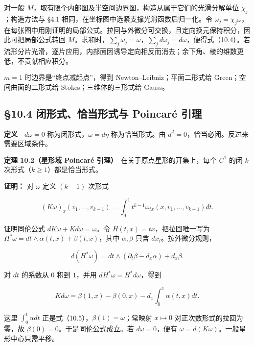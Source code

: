 \documentclass[11pt,a4paper]{article}
\begin{document}
对一般 \(M\)，取有限个内部图及半空间边界图，构造从属于它们的光滑分解单位
\(\chi_j\)；构造方法与 §4.1 相同，在坐标图中选紧支撑光滑函数后归一化。令
\(\omega_j=\chi_j\omega\)，在每张图中用刚证明的局部公式。拉回与外微分可交换，且定向换元保持积分，因此可把局部公式转回
\(M\)。求和时，\(\sum_j\omega_j=\omega\)，\(\sum_jd\omega_j=d\omega\)，便得式（10.4）。若流形分片光滑，逐片应用，内部面因诱导定向相反而消去；余下角、棱的维数更低，不贡献相应积分。

\(m=1\) 时边界是``终点减起点''，得到 Newton--Leibniz；平面二形式给
Green；空间曲面的二形式给 Stokes；三维体的三形式给 Gauss。

\subsection{§10.4 闭形式、恰当形式与 Poincaré
引理}\label{ux95edux5f62ux5f0fux6070ux5f53ux5f62ux5f0fux4e0e-poincaruxe9-ux5f15ux7406}

\textbf{定义}　\(d\omega=0\) 称为闭形式，\(\omega=d\eta\)
称为恰当形式。由 \(d^2=0\)，恰当必闭。反过来需要区域条件。

\textbf{定理 10.2（星形域 Poincaré 引理）}　在关于原点星形的开集上，每个
\(C^1\) 的闭 \(k\) 次形式（\(k\ge1\)）都是恰当形式。

\textbf{证明：} 对 \(\omega\) 定义 \((k-1)\) 次形式

\begin{equation*}
 (K\omega)_x(v_1,\ldots,v_{k-1})
 =\int_0^1t^{k-1}\omega_{tx}(x,v_1,\ldots,v_{k-1})dt.\tag{10.5}
\end{equation*}

证明同伦公式 \(dK\omega+Kd\omega=\omega\)。令
\(H(t,x)=tx\)，把拉回唯一写为
\(H^*\omega=dt\wedge\alpha(t,x)+\beta(t,x)\)，其中 \(\alpha,\beta\) 只含
\(dx_i\)。按外微分规则，

\begin{equation*}
 d(H^*\omega)=dt\wedge(\partial_t\beta-d_x\alpha)+d_x\beta.
\end{equation*}

对 \(dt\) 的系数从 \(0\) 积到 \(1\)，并用
\(dH^*\omega=H^*d\omega\)，得到

\begin{equation*}
 Kd\omega=\beta(1,x)-\beta(0,x)-d_x\int_0^1\alpha(t,x)dt.
\end{equation*}

这里 \(\int_0^1\alpha dt\) 正是式（10.5），\(\beta(1)=\omega\)；常映射
\(x\mapsto0\) 对正次数形式的拉回为零，故
\(\beta(0)=0\)。于是同伦公式成立。若 \(d\omega=0\)，便有
\(\omega=d(K\omega)\)。一般星形中心只需平移。
\end{document}
